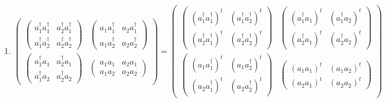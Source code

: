 \documentclass[aps,preprint]{revtex4}
\begin{document}
\begin{enumerate}
\begin{enumerate}
\item 
\begin{equation}
\left( 
\begin{array}{cc}
\left( 
\begin{array}{cc}
a_{1}^{\dagger }a_{1}^{\dagger } & a_{2}^{\dagger }a_{1}^{\dagger } \\ 
a_{1}^{\dagger }a_{2}^{\dagger } & a_{2}^{\dagger }a_{2}^{\dagger }%
\end{array}%
\right) & \left( 
\begin{array}{cc}
a_{1}a_{1}^{\dagger } & a_{2}a_{1}^{\dagger } \\ 
a_{1}a_{2}^{\dagger } & a_{2}a_{2}^{\dagger }%
\end{array}%
\right) \\ 
\left( 
\begin{array}{cc}
a_{1}^{\dagger }a_{1} & a_{2}^{\dagger }a_{1} \\ 
a_{1}^{\dagger }a_{2} & a_{2}^{\dagger }a_{2}%
\end{array}%
\right) & \left( 
\begin{array}{cc}
a_{1}a_{1} & a_{2}a_{1} \\ 
a_{1}a_{2} & a_{2}a_{2}%
\end{array}%
\right)%
\end{array}%
\right) =\left( 
\begin{array}{cc}
\left( 
\begin{array}{cc}
\left( a_{1}^{\dagger }a_{1}^{\dagger }\right) ^{t} & \left( a_{1}^{\dagger
}a_{2}^{\dagger }\right) ^{t} \\ 
\left( a_{2}^{\dagger }a_{1}^{\dagger }\right) ^{t} & \left( a_{2}^{\dagger
}a_{2}^{\dagger }\right) ^{t}%
\end{array}%
\right) & \left( 
\begin{array}{cc}
\left( a_{1}^{\dagger }a_{1}\right) ^{t} & \left( a_{1}^{\dagger
}a_{2}\right) ^{t} \\ 
\left( a_{2}^{\dagger }a_{1}\right) ^{t} & \left( a_{2}^{\dagger
}a_{2}\right) ^{t}%
\end{array}%
\right) \\ 
\left( 
\begin{array}{cc}
\left( a_{1}a_{1}^{\dagger }\right) ^{t} & \left( a_{1}a_{2}^{\dagger
}\right) ^{t} \\ 
\left( a_{2}a_{1}^{\dagger }\right) ^{t} & \left( a_{2}a_{2}^{\dagger
}\right) ^{t}%
\end{array}%
\right) & \left( 
\begin{array}{cc}
\left( a_{1}a_{1}\right) ^{t} & \left( a_{1}a_{2}\right) ^{t} \\ 
\left( a_{2}a_{1}\right) ^{t} & \left( a_{2}a_{2}\right) ^{t}%
\end{array}%
\right)%
\end{array}%
\right)
\end{equation}


\end{enumerate}
\end{enumerate}
\end{document}
